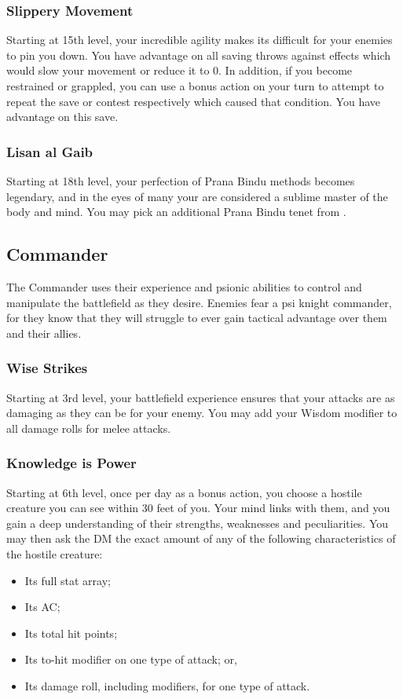 \subsubsection{Slippery Movement}
Starting at 15th level,
your incredible agility makes its difficult for your
enemies to pin you down.
You have advantage on all saving throws against effects
which would slow your movement or reduce it to 0.
In addition,
if you become restrained or grappled,
you can use a bonus action on your turn
to attempt to repeat the save
or contest respectively which caused that condition.
You have advantage on this save.

\subsubsection{Lisan al Gaib}
Starting at 18th level,
your perfection of Prana Bindu methods becomes legendary,
and in the eyes of many your are considered a
sublime master of the body and mind.
You may pick an additional Prana Bindu tenet from
.

\subsection{Commander}
The Commander uses their experience and psionic abilities
to control and manipulate the battlefield as they desire.
Enemies fear a psi knight commander,
for they know that they will struggle to ever
gain tactical advantage over them and their allies.

\subsubsection{Wise Strikes}
Starting at 3rd level,
your battlefield experience ensures that your attacks
are as damaging as they can be for your enemy.
You may add your Wisdom modifier to all damage
rolls for melee attacks. 

\subsubsection{Knowledge is Power}
Starting at 6th level,
once per day as a bonus action,
you choose a hostile creature you can see within
30 feet of you.
Your mind links with them,
and you gain a deep understanding of their
strengths, weaknesses and peculiarities.
You may then ask the DM the exact amount of any of the following
characteristics of the hostile creature:
\begin{itemize}
    \item Its full stat array;
    \item Its AC;
    \item Its total hit points;
    \item Its to-hit modifier on one type of attack; or,
    \item Its damage roll, including modifiers, for one type
            of attack.
\end{itemize}


